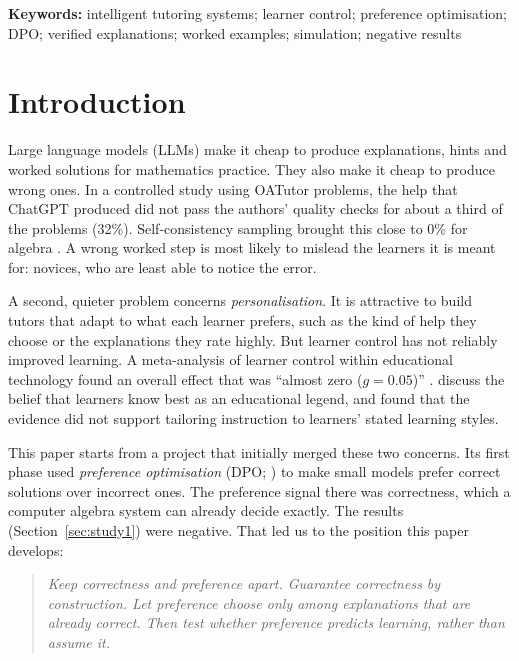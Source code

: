 \documentclass[11pt,a4paper]{article}
\begin{document}
\vspace{0.5em}
\noindent\textbf{Keywords:} intelligent tutoring systems; learner control; preference optimisation; DPO; verified explanations; worked examples; simulation; negative results

\section{Introduction}
\label{sec:intro}

Large language models (LLMs) make it cheap to produce explanations, hints and worked
solutions for mathematics practice. They also make it cheap to produce wrong ones. In a
controlled study using OATutor problems, the help that ChatGPT produced did not pass the
authors' quality checks for about a third of the problems (32\%). Self-consistency sampling
brought this close to 0\% for algebra
\citep{pardos2024chatgpt}. A wrong worked step is most likely to mislead the learners it is meant
for: novices, who are least able to notice the error.

A second, quieter problem concerns \emph{personalisation}. It is attractive to build tutors
that adapt to what each learner prefers, such as the kind of help they choose or the
explanations they rate highly. But learner control has not reliably improved learning. A
meta-analysis of learner control within educational technology found an overall effect that
was ``almost zero ($g = 0.05$)'' \citep{karich2014updated}. \citet{kirschner2013learners} discuss the belief that learners know
best as an educational legend, and \citet{pashler2008learning} found that the evidence did
not support tailoring instruction to learners' stated learning styles.

This paper starts from a project that initially merged these two concerns. Its first phase
used \emph{preference optimisation} (DPO; \citealp{rafailov2023direct}) to make small models
prefer correct solutions over incorrect ones. The preference signal there was
correctness, which a computer algebra system can already decide exactly. The results
(Section~\ref{sec:study1}) were negative. That led us to the position this paper
develops:

\begin{quote}
\emph{Keep correctness and preference apart. Guarantee correctness by construction. Let
preference choose only among explanations that are already correct. Then test whether
preference predicts learning, rather than assume it.}
\end{quote}
\end{document}
